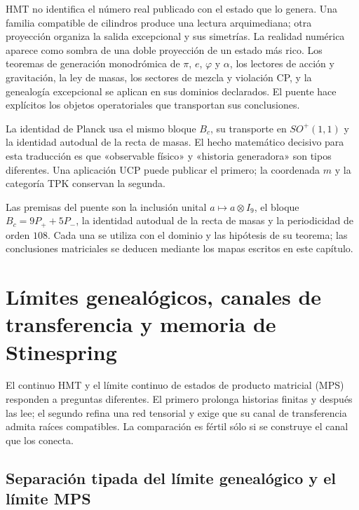 HMT no identifica el número real publicado con el estado que lo genera. Una
familia compatible de cilindros produce una lectura arquimediana; otra
proyección organiza la salida excepcional y sus simetrías. La realidad
numérica aparece como sombra de una doble proyección de un estado más rico.
Los teoremas de generación monodrómica de $\pi$, $e$, $\varphi$ y $\alpha$,
los lectores de acción y
gravitación, la ley de masas, los sectores de mezcla y violación CP, y la
genealogía excepcional se aplican en sus dominios declarados. El puente hace
explícitos los objetos operatoriales que transportan sus conclusiones.

La identidad de Planck usa el mismo bloque $B_c$, su
transporte en $SO^+(1,1)$ y la identidad autodual de la recta de masas. El
hecho matemático decisivo para esta traducción es que «observable físico» y
«historia generadora» son tipos diferentes. Una aplicación UCP puede publicar
el primero; la coordenada $m$ y la categoría TPK conservan la segunda.

\begin{sourcebox}
Las premisas del puente son la inclusión unital
$a\mapsto a\otimes I_9$, el bloque $B_c=9P_++5P_-$, la identidad autodual de
la recta de masas y la periodicidad de orden \(108\). Cada una se utiliza con
el dominio y las hipótesis de su teorema; las conclusiones matriciales se
deducen mediante los mapas escritos en este capítulo.
\end{sourcebox}


\ifdefined\HMTGMCContinuumMPS
\section{Límites genealógicos, canales de transferencia y memoria de Stinespring}
\label{p12-83-c22-s7:gmc:chap:continuo-mps}

El continuo HMT y el límite continuo de estados de producto matricial (MPS)
responden a preguntas diferentes. El primero prolonga historias finitas y
después las lee; el segundo refina una red tensorial y exige que su canal de
transferencia admita raíces compatibles. La comparación es fértil sólo si se
construye el canal que los conecta.

\subsection{Separación tipada del límite genealógico y el límite MPS}


